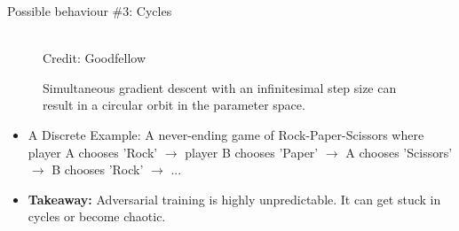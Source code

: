\begin{frame} {Possible behaviour \#3: Cycles}
  \begin{figure}
    \centering
      \tiny{\\Credit: Goodfellow}
      \caption{\footnotesize Simultaneous gradient descent with an infinitesimal step size can result in a circular orbit in the parameter space.}
  \end{figure}
  \begin{itemize}
    \item A Discrete Example: A never-ending game of Rock-Paper-Scissors where player A chooses 'Rock' $\rightarrow$ player B chooses 'Paper' $\rightarrow$ A chooses 'Scissors' $\rightarrow$ B chooses 'Rock' $\rightarrow$ ...
   \item  \textbf{Takeaway:} Adversarial training is highly unpredictable. It can get stuck in cycles or become chaotic.
  \end{itemize}
\end{frame}


